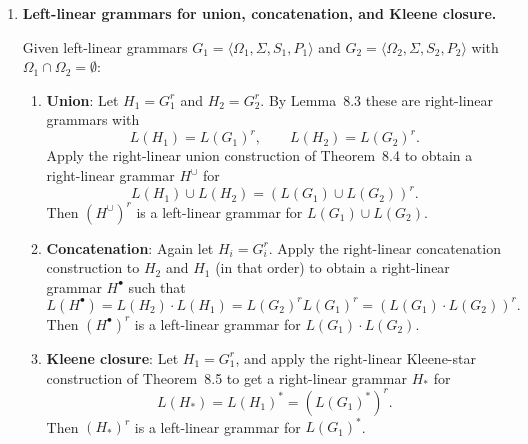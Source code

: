 \begin{enumerate}[{8.}1. ]
\begin{enumerate}
\item Example:
\[
G_1=\langle\{S_1\},\{\pmb{a},\pmb{b}\},S_1,\{S_1\to\pmb{a}\}\rangle,\qquad
G_2=\langle\{S_2\},\{\pmb{a},\pmb{b}\},S_2,\{S_2\to\pmb{b}\}\rangle.
\]
Both grammars are in the Theorem~8.8 normal form: every production is of the
form $A\to\pmb{a}$ or $A\to\pmb{b}$, and there are no contracting productions.
But the union construction of Theorem~8.4 gives
\[
G^\cup=\langle\{Z,S_1,S_2\},\{\pmb{a},\pmb{b}\},Z,\{Z\to S_1,\ Z\to S_2,\ S_1\to\pmb{a},\ S_2\to\pmb{b}\}\rangle.
\]
The productions $Z\to S_1$ and $Z\to S_2$ are unit productions, not of the form
$A\to\pmb{a}B$ or $A\to\pmb{a}$, so $G^\cup$ is not in the normal form of
Theorem~8.8.
\item The $G^\bullet$ construction for concatenation in Example 8.18 is not normal form-preserving in general, since it requires replacing terminal productions $A \to w$ with $A \to wS_2$, which is a right-linear production but may violate other normal form constraints.
\end{enumerate}

\item \textbf{Left-linear grammars for union, concatenation, and Kleene closure.}

Given left-linear grammars $G_1 = \langle\Omega_1,\Sigma,S_1,P_1\rangle$ and $G_2 = \langle\Omega_2,\Sigma,S_2,P_2\rangle$ with $\Omega_1 \cap \Omega_2 = \emptyset$:

\begin{enumerate}
\item \textbf{Union}: Let $H_1=G_1^r$ and $H_2=G_2^r$.  By Lemma~8.3 these are
right-linear grammars with
\[
L(H_1)=L(G_1)^r,\qquad L(H_2)=L(G_2)^r.
\]
Apply the right-linear union construction of Theorem~8.4 to obtain a
right-linear grammar $H^\cup$ for
\[
L(H_1)\cup L(H_2)=(L(G_1)\cup L(G_2))^r.
\]
Then $(H^\cup)^r$ is a left-linear grammar for $L(G_1)\cup L(G_2)$.

\item \textbf{Concatenation}: Again let $H_i=G_i^r$.  Apply the right-linear
concatenation construction to $H_2$ and $H_1$ (in that order) to obtain a
right-linear grammar $H^\bullet$ such that
\[
L(H^\bullet)=L(H_2)\cdot L(H_1)=L(G_2)^rL(G_1)^r=(L(G_1)\cdot L(G_2))^r.
\]
Then $(H^\bullet)^r$ is a left-linear grammar for $L(G_1)\cdot L(G_2)$.

\item \textbf{Kleene closure}: Let $H_1=G_1^r$, and apply the right-linear
Kleene-star construction of Theorem~8.5 to get a right-linear grammar $H_*$ for
\[
L(H_*)=L(H_1)^*=(L(G_1)^*)^r.
\]
Then $(H_*)^r$ is a left-linear grammar for $L(G_1)^*$.
\end{enumerate}

\end{enumerate}

